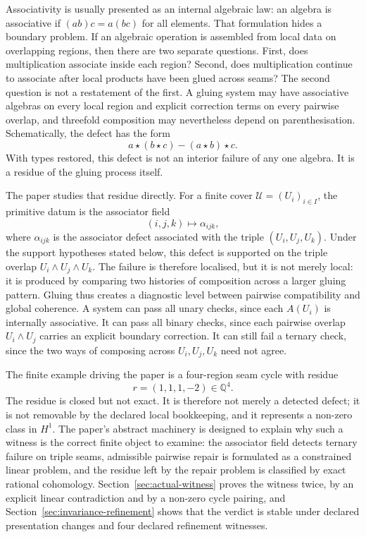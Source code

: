\documentclass[11pt]{article}
\newcommand{\Q}{\mathbb{Q}}
\begin{document}
Associativity is usually presented as an internal algebraic law: an algebra is associative if \((ab)c=a(bc)\) for all elements. That formulation hides a boundary problem. If an algebraic operation is assembled from local data on overlapping regions, then there are two separate questions. First, does multiplication associate inside each region? Second, does multiplication continue to associate after local products have been glued across seams? The second question is not a restatement of the first. A gluing system may have associative algebras on every local region and explicit correction terms on every pairwise overlap, and threefold composition may nevertheless depend on parenthesisation. Schematically, the defect has the form
\[
a \star (b \star c) - (a \star b) \star c .
\]
With types restored, this defect is not an interior failure of any one algebra. It is a residue of the gluing process itself.

The paper studies that residue directly. For a finite cover \(\mathcal U=(U_i)_{i\in I}\), the primitive datum is the associator field
\[
(i,j,k) \longmapsto \alpha_{ijk},
\]
where \(\alpha_{ijk}\) is the associator defect associated with the triple \((U_i,U_j,U_k)\). Under the support hypotheses stated below, this defect is supported on the triple overlap \(U_i\wedge U_j\wedge U_k\). The failure is therefore localised, but it is not merely local: it is produced by comparing two histories of composition across a larger gluing pattern. Gluing thus creates a diagnostic level between pairwise compatibility and global coherence. A system can pass all unary checks, since each \(A(U_i)\) is internally associative. It can pass all binary checks, since each pairwise overlap \(U_i\wedge U_j\) carries an explicit boundary correction. It can still fail a ternary check, since the two ways of composing across \(U_i,U_j,U_k\) need not agree.

The finite example driving the paper is a four-region seam cycle with residue
\[
r=(1,1,1,-2)\in\Q^4 .
\]
The residue is closed but not exact. It is therefore not merely a detected defect; it is not removable by the declared local bookkeeping, and it represents a non-zero class in \(H^1\). The paper's abstract machinery is designed to explain why such a witness is the correct finite object to examine: the associator field detects ternary failure on triple seams, admissible pairwise repair is formulated as a constrained linear problem, and the residue left by the repair problem is classified by exact rational cohomology. Section~\ref{sec:actual-witness} proves the witness twice, by an explicit linear contradiction and by a non-zero cycle pairing, and Section~\ref{sec:invariance-refinement} shows that the verdict is stable under declared presentation changes and four declared refinement witnesses.
\end{document}
